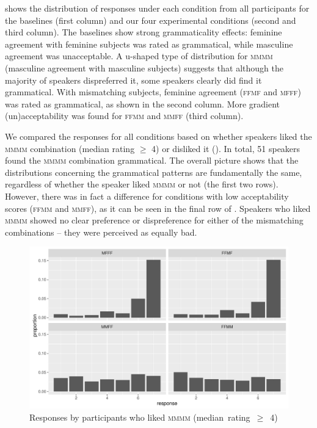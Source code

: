 \documentclass[output=paper,
modfonts,
newtxmath,
hidelinks
]{langscibook}
\begin{document}
 shows the distribution of responses under each condition from all participants for the baselines (first column) and our four experimental conditions (second and third column). The baselines show strong grammaticality effects: feminine agreement with feminine subjects was rated as grammatical, while masculine agreement was unacceptable. A u-shaped
type of distribution for \textsc{mmmm} (masculine agreement with masculine subjects) suggests that although the majority of
speakers dispreferred it, some speakers clearly did find it grammatical. With mismatching subjects, feminine agreement (\textsc{ffmf} and \textsc{mfff}) was rated as grammatical, as shown in the second column. More gradient (un)acceptability was found for  \textsc{ffmm} and \textsc{mmff} (third column).

We compared the responses for all conditions based on whether speakers liked the \textsc{mmmm} combination (median rating $\geq$ 4) or disliked it (). In total, 51 speakers found the \textsc{mmmm} combination grammatical. The overall picture shows that the distributions concerning the grammatical patterns are fundamentally the same, regardless of whether the speaker liked \textsc{mmmm} or not (the first two rows). However, there was in fact a difference for conditions with low acceptability scores (\textsc{ffmm} and \textsc{mmff}), as it can be seen in the final row of . Speakers who liked \textsc{mmmm} showed no clear preference or dispreference for either of the mismatching combinations -- they were perceived as equally bad.

\begin{figure}[b]
	\centering
	\includegraphics[height=.35\textheight]{figures/14resps-final.pdf}
	\caption{Responses by participants who liked \textsc{mmmm} \mbox{(median rating $\geq$ 4)\hspace*{-6mm}}}\label{14:fig:resps-final}
\end{figure}
\end{document}

